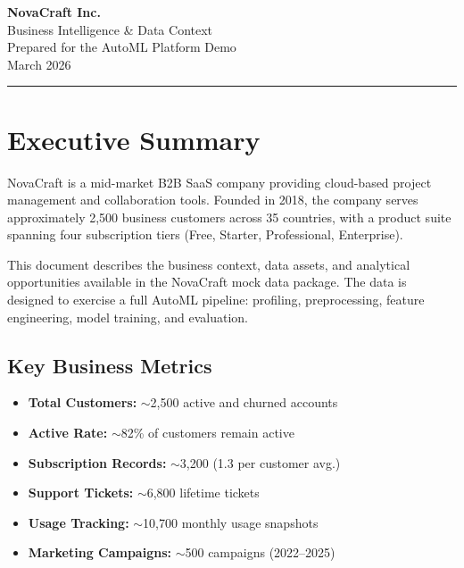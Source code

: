 \documentclass[11pt,a4paper]{article}
\begin{document}
\begin{center}
    {\Huge\bfseries\textcolor{ncblue}{NovaCraft Inc.}}\\[0.5em]
    {\Large Business Intelligence \& Data Context}\\[1em]
    {\large\textcolor{ncgray}{Prepared for the AutoML Platform Demo}}\\[0.5em]
    {\textcolor{ncgray}{March 2026}}
\end{center}

\vspace{1em}
\hrule
\vspace{1.5em}

\section{Executive Summary}

NovaCraft is a mid-market B2B SaaS company providing cloud-based project management
and collaboration tools. Founded in 2018, the company serves approximately 2,500
business customers across 35 countries, with a product suite spanning four
subscription tiers (Free, Starter, Professional, Enterprise).

This document describes the business context, data assets, and analytical
opportunities available in the NovaCraft mock data package. The data is designed
to exercise a full AutoML pipeline: profiling, preprocessing, feature engineering,
model training, and evaluation.

\subsection{Key Business Metrics}

\begin{itemize}[nosep]
    \item \textbf{Total Customers:} $\sim$2,500 active and churned accounts
    \item \textbf{Active Rate:} $\sim$82\% of customers remain active
    \item \textbf{Subscription Records:} $\sim$3,200 (1.3 per customer avg.)
    \item \textbf{Support Tickets:} $\sim$6,800 lifetime tickets
    \item \textbf{Usage Tracking:} $\sim$10,700 monthly usage snapshots
    \item \textbf{Marketing Campaigns:} $\sim$500 campaigns (2022--2025)
\end{itemize}
\end{document}
